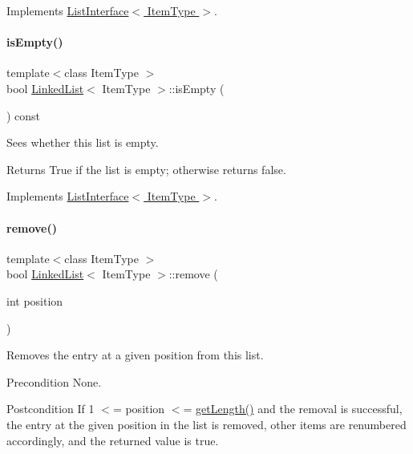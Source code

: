 Implements \hyperlink{class_list_interface_a5b2f86954a86172699a3495982c38e77}{List\+Interface$<$ Item\+Type $>$}.

\hypertarget{class_linked_list_a008e916c3d51d28b4cc9c8cdf3e9d921}{}\label{class_linked_list_a008e916c3d51d28b4cc9c8cdf3e9d921} 
\paragraph{\texorpdfstring{is\+Empty()}{isEmpty()}}
{\footnotesize\ttfamily template$<$class Item\+Type $>$ \\
bool \hyperlink{class_linked_list}{Linked\+List}$<$ Item\+Type $>$\+::is\+Empty (\begin{DoxyParamCaption}{ }\end{DoxyParamCaption}) const\hspace{0.3cm}{\ttfamily [virtual]}}

Sees whether this list is empty. \begin{DoxyReturn}{Returns}
True if the list is empty; otherwise returns false. 
\end{DoxyReturn}


Implements \hyperlink{class_list_interface_a924f91e7f81d7dcd3fda79bbcc671394}{List\+Interface$<$ Item\+Type $>$}.

\hypertarget{class_linked_list_a16a02716b5b2efb6fb1e3d18721b53e4}{}\label{class_linked_list_a16a02716b5b2efb6fb1e3d18721b53e4} 
\paragraph{\texorpdfstring{remove()}{remove()}}
{\footnotesize\ttfamily template$<$class Item\+Type $>$ \\
bool \hyperlink{class_linked_list}{Linked\+List}$<$ Item\+Type $>$\+::remove (\begin{DoxyParamCaption}\item[{int}]{position }\end{DoxyParamCaption})\hspace{0.3cm}{\ttfamily [virtual]}}

Removes the entry at a given position from this list. \begin{DoxyPrecond}{Precondition}
None. 
\end{DoxyPrecond}
\begin{DoxyPostcond}{Postcondition}
If 1 $<$= position $<$= \hyperlink{class_linked_list_a61d045ef6008b494a1a516ecc992c0e7}{get\+Length()} and the removal is successful, the entry at the given position in the list is removed, other items are renumbered accordingly, and the returned value is true. 
\end{DoxyPostcond}

